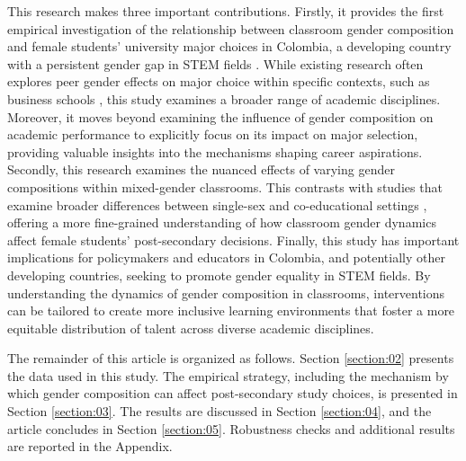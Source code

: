 This research makes three important contributions. Firstly, it provides the first empirical investigation of the relationship between classroom gender composition and female students' university major choices in Colombia, a developing country with a persistent gender gap in STEM fields \citep{informe2023lee}. While existing research often explores peer gender effects on major choice within specific contexts, such as business schools \citep{zolitz2021effect}, this study examines a broader range of academic disciplines.  Moreover, it moves beyond examining the influence of gender composition on academic performance \citep{EISENKOPF2015123, Pregaldini2020_1} to explicitly focus on its impact on major selection, providing valuable insights into the mechanisms shaping career aspirations. Secondly, this research examines the nuanced effects of varying gender compositions within mixed-gender classrooms.  This contrasts with studies that examine broader differences between single-sex and co-educational settings \citep{bernal2022effect}, offering a more fine-grained understanding of how classroom gender dynamics affect female students' post-secondary decisions. Finally, this study has important implications for policymakers and educators in Colombia, and potentially other developing countries, seeking to promote gender equality in STEM fields. By understanding the dynamics of gender composition in classrooms, interventions can be tailored to create more inclusive learning environments that foster a more equitable distribution of talent across diverse academic disciplines.


The remainder of this article is organized as follows. Section \ref{section:02} presents the data used in this study. The empirical strategy, including the mechanism by which gender composition can affect post-secondary study choices, is presented in Section \ref{section:03}. The results are discussed in Section \ref{section:04}, and the article concludes in Section \ref{section:05}. Robustness checks and additional results are reported in the Appendix. 



